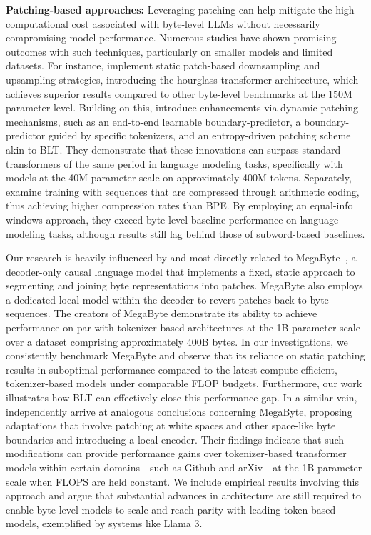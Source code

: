 \textbf{Patching-based approaches:} Leveraging patching can help mitigate the high computational cost associated with byte-level LLMs without necessarily compromising model performance. Numerous studies have shown promising outcomes with such techniques, particularly on smaller models and limited datasets. For instance, \cite{nawrot-etal-2022-hierarchical} implement static patch-based downsampling and upsampling strategies, introducing the hourglass transformer architecture, which achieves superior results compared to other byte-level benchmarks at the 150M parameter level. Building on this, \cite{nawrot-etal-2023-efficient} introduce enhancements via dynamic patching mechanisms, such as an end-to-end learnable boundary-predictor, a boundary-predictor guided by specific tokenizers, and an entropy-driven patching scheme akin to {\textsc BLT}. They demonstrate that these innovations can surpass standard transformers of the same period in language modeling tasks, specifically with models at the 40M parameter scale on approximately 400M tokens. Separately, \cite{lester2024training} examine training with sequences that are compressed through arithmetic coding, thus achieving higher compression rates than BPE. By employing an equal-info windows approach, they exceed byte-level baseline performance on language modeling tasks, although results still lag behind those of subword-based baselines.

Our research is heavily influenced by and most directly related to MegaByte~\citep{yu2023megabyte}, a decoder-only causal language model that implements a fixed, static approach to segmenting and joining byte representations into patches. MegaByte also employs a dedicated local model within the decoder to revert patches back to byte sequences. The creators of MegaByte demonstrate its ability to achieve performance on par with tokenizer-based architectures at the 1B parameter scale over a dataset comprising approximately 400B bytes. In our investigations, we consistently benchmark MegaByte and observe that its reliance on static patching results in suboptimal performance compared to the latest compute-efficient, tokenizer-based models under comparable FLOP budgets. Furthermore, our work illustrates how {\textsc BLT} can effectively close this performance gap. In a similar vein, \cite{slagle2024spacebyte} independently arrive at analogous conclusions concerning MegaByte, proposing adaptations that involve patching at white spaces and other space-like byte boundaries and introducing a local encoder. Their findings indicate that such modifications can provide performance gains over tokenizer-based transformer models within certain domains—such as Github and arXiv—at the 1B parameter scale when FLOPS are held constant. We include empirical results involving this approach and argue that substantial advances in architecture are still required to enable byte-level models to scale and reach parity with leading token-based models, exemplified by systems like Llama 3.

